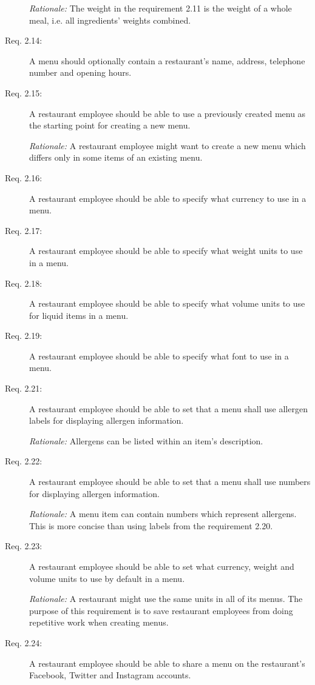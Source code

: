 \begin{description}
    \emph{Rationale:} The weight in the requirement 2.11 is the weight of a whole meal, i.e. all ingredients' weights combined.
    \item [Req. 2.14:] A menu should optionally contain a restaurant's name, address, telephone number and opening hours.
    \item [Req. 2.15:] A restaurant employee should be able to use a previously created menu as the starting point for creating a new menu.

    \emph{Rationale:} A restaurant employee might want to create a new menu which differs only in some items of an existing menu.
    \item [Req. 2.16:] A restaurant employee should be able to specify what currency to use in a menu.
    \item [Req. 2.17:] A restaurant employee should be able to specify what weight units to use in a menu.
    \item [Req. 2.18:] A restaurant employee should be able to specify what volume units to use for liquid items in a menu.
    \item [Req. 2.19:] A restaurant employee should be able to specify what font to use in a menu.

    \item [Req. 2.21:] A restaurant employee should be able to set that a menu shall use allergen labels for displaying allergen information.

    \emph{Rationale:} Allergens can be listed within an item's description.
    \item [Req. 2.22:] A restaurant employee should be able to set that a menu shall use numbers for displaying allergen information.

    \emph{Rationale:} A menu item can contain numbers which represent allergens. This is more concise than using labels from the requirement 2.20.
    \item [Req. 2.23:] A restaurant employee should be able to set what currency, weight and volume units to use by default in a menu.
  
    \emph{Rationale:} A restaurant might use the same units in all of its menus. The purpose of this requirement is to save restaurant employees from doing repetitive work when creating menus.
    \item [Req. 2.24:] A restaurant employee should be able to share a menu on the restaurant's Facebook, Twitter and Instagram accounts.
  \end{description}

